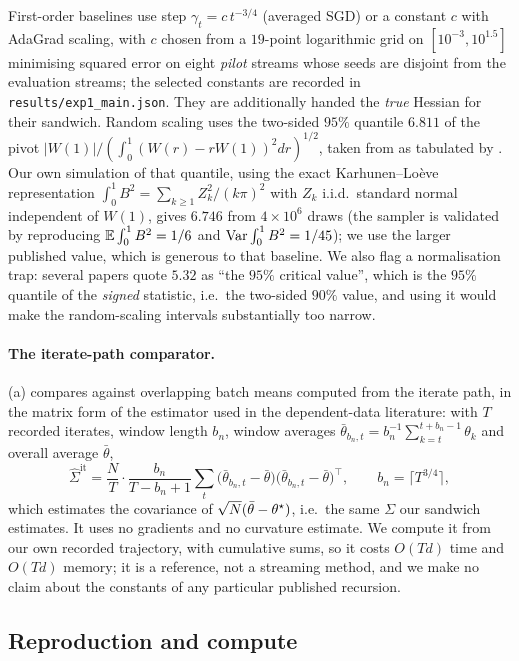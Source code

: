 First-order baselines use step $\gamma_t=c\,t^{-3/4}$ (averaged SGD) or a constant $c$ with
AdaGrad scaling, with $c$ chosen from a $19$-point logarithmic grid on $[10^{-3},10^{1.5}]$
minimising squared error on eight \emph{pilot} streams whose seeds are disjoint from the
evaluation streams; the selected constants are recorded in
\texttt{results/exp1\_main.json}. They are additionally handed the \emph{true} Hessian for
their sandwich. Random scaling uses the two-sided $95\%$ quantile $6.811$ of the pivot
$|W(1)|/(\int_0^1(W(r)-rW(1))^2dr)^{1/2}$, taken from
\citet{kiefer2002heteroskedasticity} as tabulated by \citet[Table 2]{lee2022fast}. Our own
simulation of that quantile, using the exact Karhunen--Lo\`eve representation
$\int_0^1B^2=\sum_{k\ge1}Z_k^2/(k\pi)^2$ with $Z_k$ i.i.d.\ standard normal independent of
$W(1)$, gives $6.746$ from $4\times10^6$ draws (the sampler is validated by reproducing
$\mathbb{E}\int_0^1B^2=1/6$ and $\operatorname{Var}\int_0^1B^2=1/45$); we use the larger published value, which is
generous to that baseline. We also flag a normalisation trap: several papers quote $5.32$ as
``the $95\%$ critical value'', which is the $95\%$ quantile of the \emph{signed} statistic,
i.e.\ the two-sided $90\%$ value, and using it would make the random-scaling intervals
substantially too narrow.

\paragraph{The iterate-path comparator.} \RefLrvRate{}(a) compares against overlapping
batch means computed from the iterate path, in the matrix form of the estimator used in the
dependent-data literature: with $T$ recorded iterates, window length $b_n$, window averages
$\bar\theta_{b_n,t}=b_n^{-1}\sum_{k=t}^{t+b_n-1}\theta_k$ and overall average $\bar\theta$,
\[
\widehat\Sigma^{\mathrm{it}}
=\frac{N}{T}\cdot\frac{b_n}{T-b_n+1}\sum_{t}
\big(\bar\theta_{b_n,t}-\bar\theta\big)\big(\bar\theta_{b_n,t}-\bar\theta\big)^{\!\top},
\qquad b_n=\lceil T^{3/4}\rceil,
\]
which estimates the covariance of $\sqrt N(\bar\theta-\theta^\star)$, i.e.\ the same $\Sigma$ our
sandwich estimates. It uses no gradients and no curvature estimate. We compute it from our own
recorded trajectory, with cumulative sums, so it costs $O(Td)$ time and $O(Td)$ memory; it is
a reference, not a streaming method, and we make no claim about the constants of any
particular published recursion.

\subsection{Reproduction and compute}
\label{app:compute}

